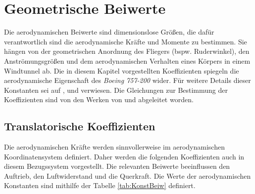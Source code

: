 \section{Geometrische Beiwerte}
\label{sec:Beiwerte}
Die aerodynamischen Beiwerte sind dimensionslose Grö{\ss}en, die dafür verantwortlich sind die aerodynamische Kräfte und Momente zu bestimmen. Sie hängen von der geometrischen Anordnung des Fliegers (bspw. Ruderwinkel), den Anströmungsgrö{\ss}en und dem aerodynamischen Verhalten eines Körpers in einem Windtunnel ab. Die in diesem Kapitel vorgestellten Koeffizienten spiegeln die aerodynamische Eigenschaft des \textit{Boeing 757-200} wider. Für weitere Details dieser Konstanten sei auf \cite{AircraftCS}, \cite{RAMPaper} und \cite{RAMYoutube_Playlist} verwiesen. Die Gleichungen zur Bestimmung der Koeffizienten sind von den Werken von \cite{FlugmechanikBuch} und \cite{FM1Skrypt} abgeleitet worden. 

\subsection{Translatorische Koeffizienten}
Die aerodynamischen Kräfte werden sinnvollerweise im aerodynamischen Koordinatensystem definiert. Daher werden die folgenden Koeffizienten auch in diesem Bezugssystem vorgestellt. Die relevanten Beiwerte beeinflussen den Auftrieb, den Luftwiderstand und die Querkraft. Die Werte der aerodynamischen Konstanten sind mithilfe der Tabelle \ref{tab:KonstBeiw} definiert. 

